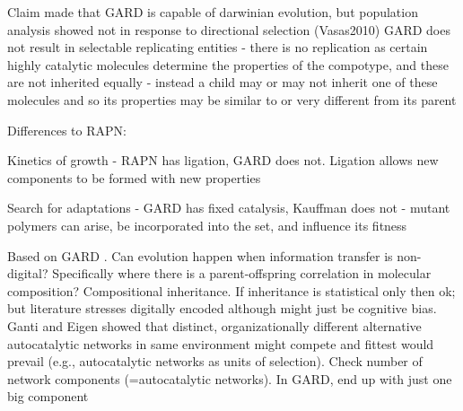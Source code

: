 Claim made that GARD is capable of darwinian evolution, but population analysis showed not in response to directional selection (Vasas2010) \parencite{Vasas2015, Vasas2012, Vasas2012a}
GARD does not result in selectable replicating entities - there is no replication as certain highly catalytic molecules determine the properties of the compotype, and these are not inherited equally - instead a child may or may not inherit one of these molecules and so its properties may be similar to or very different from its parent \parencite{Vasas2015, Vasas2012, Vasas2012a}

Differences to RAPN:
\begin{compactitem}
	\item Kinetics of growth - RAPN has ligation, GARD does not. Ligation allows new components to be formed with new properties
	\item Search for adaptations - GARD has fixed catalysis, Kauffman does not - mutant polymers can arise, be incorporated into the set, and influence its fitness
\end{compactitem}

\parencite{Vasas2015, Vasas2012, Vasas2012a}
Based on GARD \parencite{Segre1998}. Can evolution happen when information transfer is non-digital? Specifically where there is a parent-offspring correlation in molecular composition? Compositional inheritance. If inheritance is statistical only then ok; but literature stresses digitally encoded although might just be cognitive bias. Ganti and Eigen showed that distinct, organizationally different alternative autocatalytic networks in same environment might compete and fittest would prevail (e.g., autocatalytic networks as units of selection).	Check number of network components (=autocatalytic networks). In GARD, end up with just one big component

%	
%

